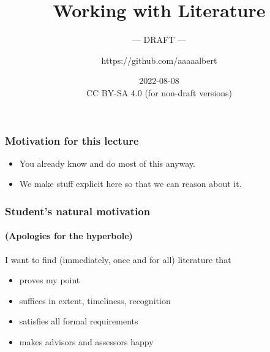 \documentclass[]{beamer} %
\title[]{Working with Literature}
\author{https://github.com/aaaaalbert}
\subtitle[]{--- DRAFT ---}
\date[]{2022-08-08\\\tiny CC BY-SA 4.0 (for non-draft versions)}
\begin{document}
\frame{\titlepage}

%

\begin{frame}
\frametitle{Motivation for this lecture}
\begin{itemize}
	\item You already know and do most of this anyway.
	\item We make stuff \alert{explicit} here so that we can reason about it.
\end{itemize}
\end{frame}

\begin{frame}
\frametitle{Student's natural motivation}
\framesubtitle{(Apologies for the hyperbole)}
I want to find (immediately, once and for all) literature that
\begin{itemize}
	\item proves my point
	\item suffices in extent, timeliness, recognition %
	\item satisfies all formal requirements
	\item makes advisors and assessors happy
\end{itemize}
\end{frame}
\end{document}
